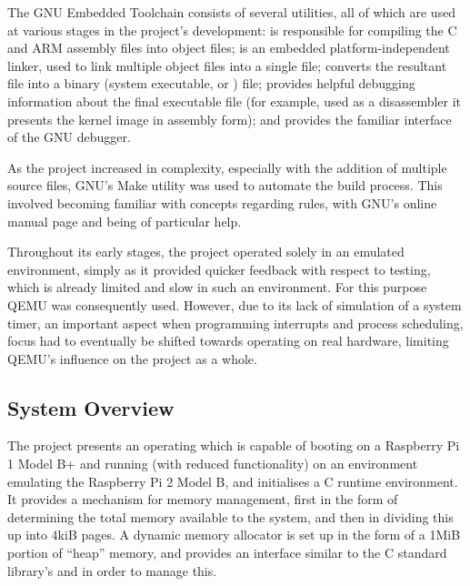         The GNU Embedded Toolchain consists of several utilities, all of which
        are used at various stages in the project's development:
         is responsible for compiling the C and ARM
        assembly files into object files;  is an embedded
        platform-independent linker, used to link multiple object files into a
        single  file;  converts the
        resultant  file into a binary (system executable, or
        ) file;  provides helpful
        debugging information about the final executable file (for example, used
        as a disassembler it presents the kernel image in assembly form); and
         provides the familiar interface of the GNU
        debugger.

        As the project increased in complexity, especially with the addition of
        multiple source files, GNU's Make utility was used to automate the build
        process. This involved becoming familiar with concepts regarding rules,
        with GNU's online manual page \cite{MakeManual} and \cite{MakeVariables}
        being of particular help.

        Throughout its early stages, the project operated solely in an emulated
        environment, simply as it provided quicker feedback with respect to
        testing, which is already limited and slow in such an environment.
        For this purpose QEMU was consequently used. However, due to its lack of
        simulation of a system timer, an important aspect when programming
        interrupts and process scheduling, focus had to eventually be shifted
        towards operating on real hardware, limiting QEMU's influence on the
        project as a whole.
 
\subsection{System Overview}
    The project presents an operating which is capable of booting on a Raspberry
    Pi 1 Model B+ and running (with reduced functionality) on an environment
    emulating the Raspberry Pi 2 Model B, and initialises a C runtime
    environment. It provides a mechanism for memory management, first in the
    form of determining the total memory available to the system, and then in
    dividing this up into 4kiB pages. A dynamic memory allocator is set up in
    the form of a 1MiB portion of ``heap'' memory, and provides an interface
    similar to the C standard library's  and  in
    order to manage this.

